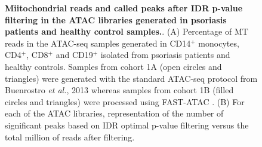 \begin{figure}[htbp]
\begin{subfigure}{0.45\textwidth}
\caption{\textbf{}}
\end{subfigure}
\caption[Mitochondrial reads and called peaks after IDR p-value filtering in the ATAC libraries generated in psoriasis patients and healthy control samples.]{\textbf{Miitochondrial reads and called peaks after IDR p-value filtering in the ATAC libraries generated in psoriasis patients and healthy control samples.}. (A) Percentage of MT reads in the ATAC-seq samples generated in CD14$^+$ monocytes, CD4$^+$, CD8$^+$ and CD19$^+$ isolated from psoriasis patients and healthy controls. Samples from cohort 1A (open circles and triangles) were generated with the standard ATAC-seq protocol from Buenrostro \textit{et al.}, 2013 whereas samples from cohort 1B (filled circles and triangles) were processed using FAST-ATAC \parencite{Corces2016}. (B) For each of the ATAC libraries, representation of the number of significant peaks based on IDR optimal p-value filtering versus the total million of reads after filtering.}
\label{figure:ATAC_PS_CTL_MT_percent_and_called_peaks}
\end{figure}





